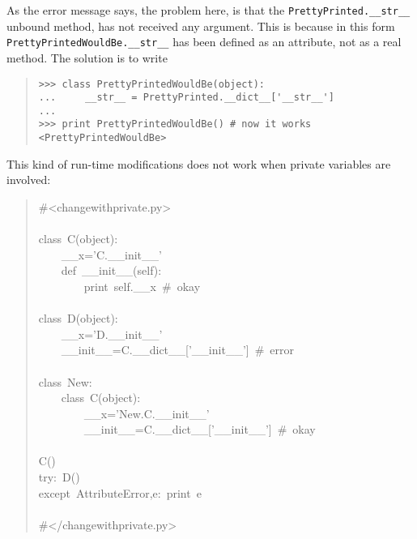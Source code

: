\documentclass[10pt,english]{article}
\begin{document}
As the error message says, the problem here, is that the 
\texttt{PrettyPrinted.{\_}{\_}str{\_}{\_}} unbound method, has not received any argument. 
This is because in this
form \texttt{PrettyPrintedWouldBe.{\_}{\_}str{\_}{\_}} has been defined as an attribute, 
not as a real method. The solution is to write
\begin{quote}
\begin{verbatim}>>> class PrettyPrintedWouldBe(object): 
...     __str__ = PrettyPrinted.__dict__['__str__']
...
>>> print PrettyPrintedWouldBe() # now it works
<PrettyPrintedWouldBe>\end{verbatim}
\end{quote}

This kind of run-time modifications does not work when private variables
are involved:
\begin{quote}
\begin{ttfamily}\begin{flushleft}
\mbox{{\#}<changewithprivate.py>}\\
\mbox{}\\
\mbox{class~C(object):}\\
\mbox{~~~~{\_}{\_}x='C.{\_}{\_}init{\_}{\_}'}\\
\mbox{~~~~def~{\_}{\_}init{\_}{\_}(self):~}\\
\mbox{~~~~~~~~print~self.{\_}{\_}x~{\#}~okay}\\
\mbox{}\\
\mbox{class~D(object):}\\
\mbox{~~~~{\_}{\_}x='D.{\_}{\_}init{\_}{\_}'}\\
\mbox{~~~~{\_}{\_}init{\_}{\_}=C.{\_}{\_}dict{\_}{\_}['{\_}{\_}init{\_}{\_}']~{\#}~error}\\
\mbox{}\\
\mbox{class~New:}\\
\mbox{~~~~class~C(object):}\\
\mbox{~~~~~~~~{\_}{\_}x='New.C.{\_}{\_}init{\_}{\_}'}\\
\mbox{~~~~~~~~{\_}{\_}init{\_}{\_}=C.{\_}{\_}dict{\_}{\_}['{\_}{\_}init{\_}{\_}']~{\#}~okay}\\
\mbox{}\\
\mbox{C()}\\
\mbox{try:~D()}\\
\mbox{except~AttributeError,e:~print~e}\\
\mbox{}\\
\mbox{{\#}</changewithprivate.py>}
\end{flushleft}\end{ttfamily}
\end{quote}
\end{document}
